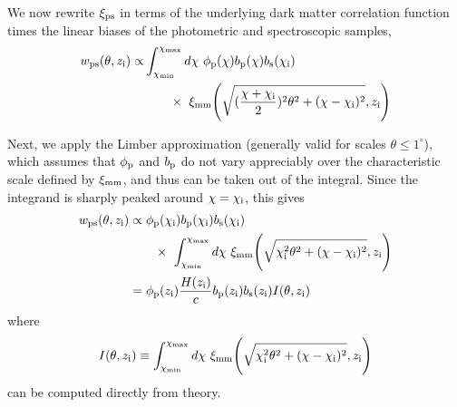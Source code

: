 \documentclass[a4paper,usenatbib]{mnras}
\begin{document}
We now rewrite $\xi_{\rm ps}$ in terms of the underlying dark matter correlation function times the linear biases of the photometric and spectroscopic samples,
%
\begin{align}\label{add_biases}
    {w}_{\rm ps}(\theta, z_{\rm i}) \propto & \int_{\chi_{\rm min}}^{\chi_{\rm max}} d\chi \ \phi_{\rm p}(\chi)b_{\rm p}(\chi)b_{\rm s} (\chi_{\rm i}) \nonumber \\
    & \hspace{0.7cm} \times \ \xi_{\rm mm}{\Bigg (}\sqrt{(\frac{\chi + \chi_{\rm i}}{2})^2\theta^2 + (\chi-\chi_{\rm i})^2},z_{\rm i}{\Bigg )}
\end{align}
%

Next, we apply the Limber approximation (generally valid for scales $\theta \leq 1^{\circ}$), which assumes that $\phi_{\rm p}$ and $b_{\rm p}$ do not vary appreciably over the characteristic scale defined by $\xi_{\rm mm}$, and thus can be taken out of the integral. Since the integrand is sharply peaked around $\chi = \chi_{\rm i}$, this gives 
%
\begin{align}\label{after_limber}
    {w}_{\rm ps}(\theta, z_{\rm i}) &\propto \phi_{\rm p}(\chi_{\rm i})b_{\rm p}(\chi_{\rm i})b_{\rm s}(\chi_{\rm i}) \nonumber \\
    & \hspace{0.7cm} \times \ \int_{\chi_{\rm min}}^{\chi_{\rm max}}d\chi \ \xi_{\rm mm}{\Bigg (}\sqrt{\chi_{\rm i}^2\theta^2 + (\chi-\chi_{\rm i})^2},z_{\rm i}{\Bigg )} \\
    &= \phi_{\rm p}(z_{\rm i})\frac{H(z_{\rm i})}{c}b_{\rm p}(z_{\rm i})b_{\rm s}(z_{\rm i})I(\theta, z_{\rm i}) \label{eqn:full}
\end{align}
%
where
%
\begin{equation}\label{defn_I}
    I(\theta, z_{\rm i}) \equiv \int_{\chi_{\rm min}}^{\chi_{\rm max}}d\chi \ \xi_{\rm mm}{\Bigg (}\sqrt{\chi_{\rm i}^2\theta^2 + (\chi-\chi_{\rm i})^2},z_{\rm i}{\Bigg )}
\end{equation}
%
can be computed directly from theory.
\end{document}
